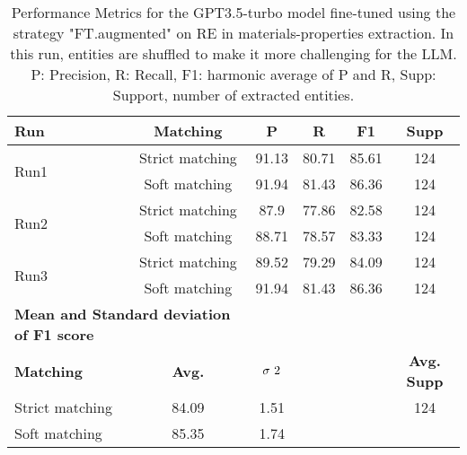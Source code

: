 \begin{table}[htbp]
    \small
    \centering
    \caption{Performance Metrics for the GPT3.5-turbo model fine-tuned using the strategy "FT.augmented" on RE in materials-properties extraction. In this run, entities are shuffled to make it more challenging for the LLM. P: Precision, R: Recall, F1: harmonic average of P and R, Supp: Support, number of extracted entities.}
    \begin{tabular}{lccccc}
        \toprule
        \textbf{Run} & \textbf{Matching} & \textbf{P} & \textbf{R} & \textbf{F1} & \textbf{Supp} \\
        \midrule
        \multirow{2}{*}{Run1}   & Strict matching   & 91.13 & 80.71 & 85.61 & 124 \\
                                & Soft matching     & 91.94 & 81.43 & 86.36 & 124 \\
        \midrule
        \multirow{2}{*}{Run2}   & Strict matching   & 87.9 & 77.86 & 82.58 & 124 \\
                                & Soft matching     & 88.71 & 78.57 & 83.33 & 124 \\
        \midrule
        \multirow{2}{*}{Run3}   & Strict matching   & 89.52 & 79.29 & 84.09 & 124 \\
                                & Soft matching     & 91.94 & 81.43 & 86.36 & 124 \\
        \midrule
        \multicolumn{2}{l}{\textbf{Mean and Standard deviation of F1 score}} & & & & \\
        \midrule
        \textbf{Matching} & \textbf{Avg.} & $\sigma\textsuperscript{2}$ & & &  \textbf{Avg. Supp}\\
        Strict matching & 84.09 & 1.51 & & & 124 \\
        Soft matching & 85.35 & 1.74 & & \\
        \bottomrule
    \end{tabular}
\end{table}

